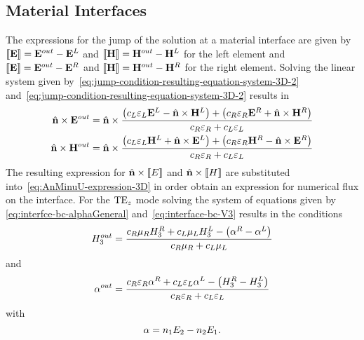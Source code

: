 \subsection{Material Interfaces}
The expressions for the jump of the solution at a material interface are given by $\llbracket \mathbf{E} \rrbracket = \mathbf{E}^{out} - \mathbf{E}^{L}$ and $\llbracket \mathbf{H} \rrbracket = \mathbf{H}^{out} - \mathbf{H}^{L}$ for the left element and $\llbracket \mathbf{E} \rrbracket = \mathbf{E}^{out} - \mathbf{E}^{R}$ and $\llbracket \mathbf{H} \rrbracket = \mathbf{H}^{out} - \mathbf{H}^{R}$ for the right element.
Solving the linear system given by~\eqref{eq:jump-condition-resulting-equation-system-3D-2} and~\eqref{eq:jump-condition-resulting-equation-system-3D-2} results in
\begin{align}
 \hat{\mathbf{n}} \times \mathbf{E}^{out} = \hat{\mathbf{n}} \times \frac{
  \left( 
c_{L} \varepsilon_L \mathbf{E}^{L} - \hat{\mathbf{n}} \times \mathbf{H}^{L}
 \right)
  +
  \left( 
c_{R} \varepsilon_R \mathbf{E}^{R} + \hat{\mathbf{n}} \times \mathbf{H}^{R}
 \right)
}{
  c_{R} \varepsilon_R + c_{L} \varepsilon_L
} \label{eq:material-interfaces-1} \\
 \hat{\mathbf{n}} \times \mathbf{H}^{out} = \hat{\mathbf{n}} \times \frac{
  \left( 
c_{L} \varepsilon_L \mathbf{H}^{L} + \hat{\mathbf{n}} \times \mathbf{E}^{L}
 \right)
  +
  \left( 
c_{R} \varepsilon_R \mathbf{H}^{R} - \hat{\mathbf{n}} \times \mathbf{E}^{R}
 \right)
}{
  c_{R} \varepsilon_R + c_{L} \varepsilon_L
} \label{eq:material-interfaces-1}
\end{align}
The resulting expression for $\hat{\mathbf{n}} \times \llbracket E \rrbracket$ and $\hat{\mathbf{n}} \times \llbracket H \rrbracket$ are substituted into~\eqref{eq:AnMinuU-expression-3D} in order obtain an expression for numerical flux on the interface.
For the $\textrm{TE}_{z}$ mode solving the system of equations given by \eqref{eq:interfce-bc-alphaGeneral} and~\eqref{eq:interface-bc-V3} results in the conditions
\begin{equation}
H_3^{out} = \frac{c_{R} \mu_R H_3^R + c_{L} \mu_L H_3^L - \left(\alpha^R - \alpha^L \right)}{c_{R} \mu_R + c_{L} \mu_L } \label{eq:interface-bc-H3-TE}
\end{equation}
and
\begin{equation}
\alpha^{out} = \frac{c_{R} \varepsilon_R \alpha^R + c_{L} \varepsilon_L \alpha^L - \left( H_3^R - H_3^L \right) }{c_{R} \varepsilon_R + c_{L} \varepsilon_L} \label{eq:interface-bc-alpha-TE}
\end{equation}
with
$$ \alpha = n_1 E_2 - n_2 E_1. $$
